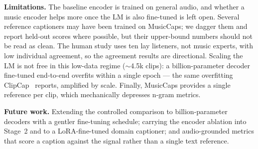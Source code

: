 \documentclass[conference]{IEEEtran}
\begin{document}
\textbf{Limitations.} The baseline encoder is trained on general audio, and whether a music
encoder helps more once the LM is also fine-tuned is left open. Several reference captioners may
have been trained on MusicCaps; we dagger them and report held-out scores where possible, but
their upper-bound numbers should not be read as clean. The human study uses ten lay listeners,
not music experts, with low individual agreement, so the agreement results are directional.
Scaling the LM is not free in this low-data regime ($\sim$4.5k clips): a billion-parameter
decoder fine-tuned end-to-end overfits within a single epoch --- the same overfitting
ClipCap~\cite{mokady2021clipcap} reports, amplified by scale. Finally, MusicCaps provides a
single reference per clip, which mechanically depresses n-gram metrics.

\textbf{Future work.} Extending the controlled comparison to billion-parameter decoders with a
gentler fine-tuning schedule; carrying the encoder ablation into Stage~2 and to a
LoRA-fine-tuned domain captioner; and audio-grounded metrics that score a caption against the
signal rather than a single text reference.
\end{document}
